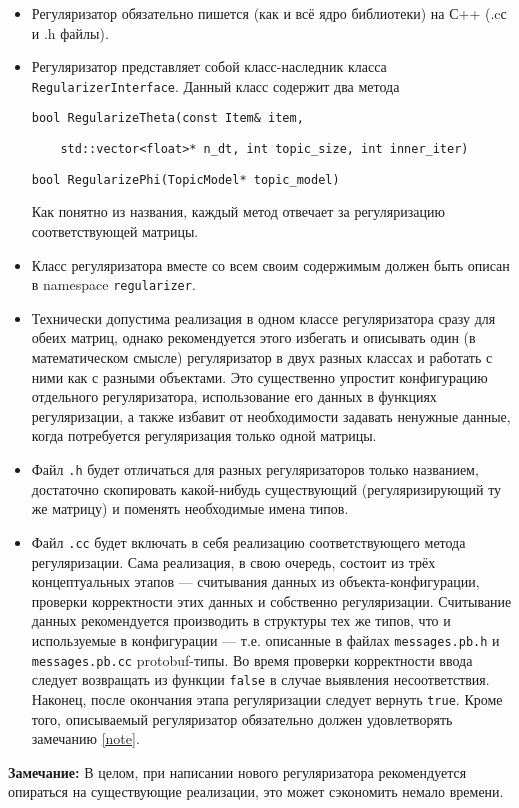 \begin{itemize}
	\item Регуляризатор обязательно пишется (как и всё ядро библиотеки) на С++ (.cс и .h файлы).

	\item Регуляризатор представляет собой класс-наследник класса \verb'RegularizerInterface'. Данный класс содержит два метода
	
	\vspace{10pt}
	\verb|bool RegularizeTheta(const Item& item,| 
	
	\verb|    std::vector<float>* n_dt, int topic_size, int inner_iter)|
	
	\verb'bool RegularizePhi(TopicModel* topic_model)'
	\vspace{10pt}
	
	Как понятно из названия, каждый метод отвечает за регуляризацию соответствующей матрицы.
	
	\item Класс регуляризатора вместе со всем своим содержимым должен быть описан в namespace \verb'regularizer'.
	
	\item Технически допустима реализация в одном классе регуляризатора сразу для обеих матриц, однако рекомендуется этого избегать и описывать один (в математическом смысле) регуляризатор в двух разных классах и работать с ними как с разными объектами. Это существенно упростит конфигурацию отдельного регуляризатора, использование его данных в функциях регуляризации, а также избавит от необходимости задавать ненужные данные, когда потребуется регуляризация только одной матрицы.
	
	\item Файл \verb'.h' будет отличаться для разных регуляризаторов только названием, достаточно скопировать какой-нибудь существующий (регуляризирующий ту же матрицу) и поменять необходимые имена типов.
	
	\item Файл \verb'.cc' будет включать в себя реализацию соответствующего метода регуляризации. Сама реализация, в свою очередь, состоит из трёх концептуальных этапов --- считывания данных из объекта-конфигурации, проверки корректности этих данных и собственно регуляризации. Считывание данных рекомендуется производить в структуры тех же типов, что и используемые в конфигурации --- т.е. описанные в файлах \verb'messages.pb.h' и \verb'messages.pb.cc' protobuf-типы. Во время проверки корректности ввода следует возвращать из функции \verb'false' в случае выявления несоответствия. Наконец, после окончания этапа регуляризации следует вернуть \verb'true'. Кроме того, описываемый регуляризатор обязательно должен удовлетворять замечанию \ref{note}.
	
\end{itemize}

{\bf Замечание: } В целом, при написании нового регуляризатора рекомендуется опираться на существующие реализации, это может сэкономить немало времени.

